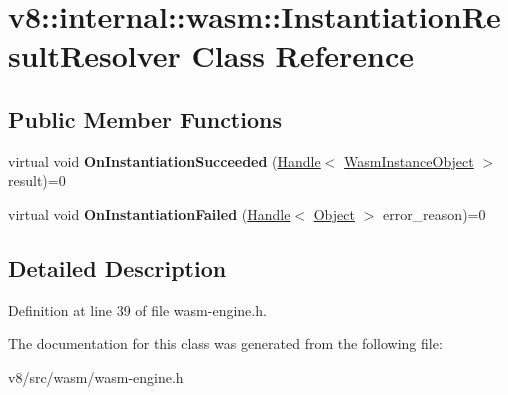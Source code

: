 \hypertarget{classv8_1_1internal_1_1wasm_1_1InstantiationResultResolver}{}\section{v8\+:\+:internal\+:\+:wasm\+:\+:Instantiation\+Result\+Resolver Class Reference}
\label{classv8_1_1internal_1_1wasm_1_1InstantiationResultResolver}
\subsection*{Public Member Functions}
\begin{DoxyCompactItemize}
\item 
\mbox{\label{classv8_1_1internal_1_1wasm_1_1InstantiationResultResolver_a412f424dd4185a6c49cdae5f7fd61b10}} 
virtual void {\bfseries On\+Instantiation\+Succeeded} (\mbox{\hyperlink{classv8_1_1internal_1_1Handle}{Handle}}$<$ \mbox{\hyperlink{classv8_1_1internal_1_1WasmInstanceObject}{Wasm\+Instance\+Object}} $>$ result)=0
\item 
\mbox{\label{classv8_1_1internal_1_1wasm_1_1InstantiationResultResolver_a7b6fd6d1809675a00733821c42b4d762}} 
virtual void {\bfseries On\+Instantiation\+Failed} (\mbox{\hyperlink{classv8_1_1internal_1_1Handle}{Handle}}$<$ \mbox{\hyperlink{classv8_1_1internal_1_1Object}{Object}} $>$ error\+\_\+reason)=0
\end{DoxyCompactItemize}


\subsection{Detailed Description}


Definition at line 39 of file wasm-\/engine.\+h.



The documentation for this class was generated from the following file\+:\begin{DoxyCompactItemize}
\item 
v8/src/wasm/wasm-\/engine.\+h\end{DoxyCompactItemize}
